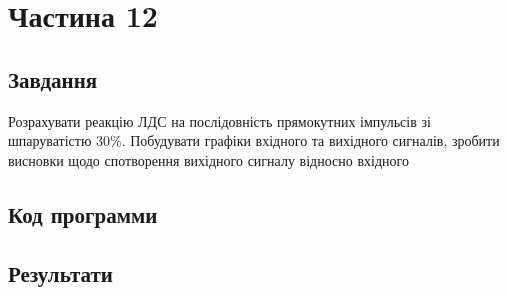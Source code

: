 \section{Частина 12}
\label{sec:task12}

\subsection{Завдання}
\label{subsec:task12_task}

Розрахувати реакцію ЛДС на послідовність прямокутних імпульсів зі
шпаруватістю 30\%. Побудувати графіки вхідного та вихідного
сигналів, зробити висновки щодо спотворення вихідного сигналу відносно
вхідного

\subsection{Код программи}
\label{subsec:task12_code}

\subsection{Результати}
\label{subsec:task12_results}

